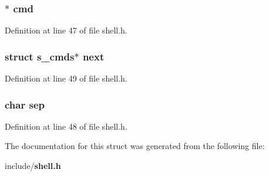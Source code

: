 \subsubsection[{cmd}]{$\ast$ cmd}\label{structs__cmds_a7833a1c1c3d06a0dc2ef489abda7bf64}


Definition at line 47 of file shell.\-h.

\subsubsection[{next}]{\setlength{\rightskip}{0pt plus 5cm}struct {\bf s\-\_\-cmds}$\ast$ next}\label{structs__cmds_a0025c4bc6dd26be6d05df24de3a1ae88}


Definition at line 49 of file shell.\-h.

\subsubsection[{sep}]{\setlength{\rightskip}{0pt plus 5cm}char sep}\label{structs__cmds_a2f44b091be60ccdd664997eb163d2ff4}


Definition at line 48 of file shell.\-h.



The documentation for this struct was generated from the following file\-:\begin{DoxyCompactItemize}
\item 
include/{\bf shell.\-h}\end{DoxyCompactItemize}
